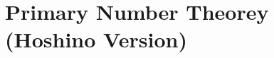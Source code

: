 \documentclass[../main.tex]{subfiles}
\begin{document}
\setcounter{section}{-4}

\section{Primary Number Theorey (Hoshino Version)}
\end{document}
